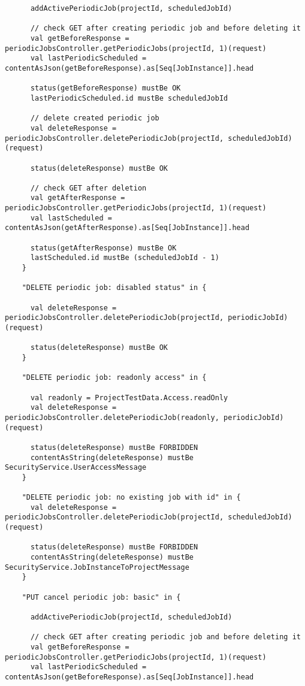 \begin{lstlisting}
      addActivePeriodicJob(projectId, scheduledJobId)

      // check GET after creating periodic job and before deleting it
      val getBeforeResponse = periodicJobsController.getPeriodicJobs(projectId, 1)(request)
      val lastPeriodicScheduled = contentAsJson(getBeforeResponse).as[Seq[JobInstance]].head

      status(getBeforeResponse) mustBe OK
      lastPeriodicScheduled.id mustBe scheduledJobId

      // delete created periodic job
      val deleteResponse = periodicJobsController.deletePeriodicJob(projectId, scheduledJobId)(request)

      status(deleteResponse) mustBe OK

      // check GET after deletion
      val getAfterResponse = periodicJobsController.getPeriodicJobs(projectId, 1)(request)
      val lastScheduled = contentAsJson(getAfterResponse).as[Seq[JobInstance]].head

      status(getAfterResponse) mustBe OK
      lastScheduled.id mustBe (scheduledJobId - 1)
    }

    "DELETE periodic job: disabled status" in {

      val deleteResponse = periodicJobsController.deletePeriodicJob(projectId, periodicJobId)(request)

      status(deleteResponse) mustBe OK
    }

    "DELETE periodic job: readonly access" in {

      val readonly = ProjectTestData.Access.readOnly
      val deleteResponse = periodicJobsController.deletePeriodicJob(readonly, periodicJobId)(request)

      status(deleteResponse) mustBe FORBIDDEN
      contentAsString(deleteResponse) mustBe SecurityService.UserAccessMessage
    }

    "DELETE periodic job: no existing job with id" in {
      val deleteResponse = periodicJobsController.deletePeriodicJob(projectId, scheduledJobId)(request)

      status(deleteResponse) mustBe FORBIDDEN
      contentAsString(deleteResponse) mustBe SecurityService.JobInstanceToProjectMessage
    }

    "PUT cancel periodic job: basic" in {

      addActivePeriodicJob(projectId, scheduledJobId)

      // check GET after creating periodic job and before deleting it
      val getBeforeResponse = periodicJobsController.getPeriodicJobs(projectId, 1)(request)
      val lastPeriodicScheduled = contentAsJson(getBeforeResponse).as[Seq[JobInstance]].head


\end{lstlisting}
